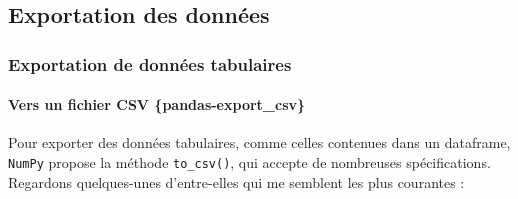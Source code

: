 \documentclass[
  12pt,
]{book}
\numberwithin{equation}{section}
\numberwithin{countremarque}{section}
\begin{document}
\subsection{Exportation des données}\label{exportation-des-donnuxe9es}

\subsubsection{Exportation de données tabulaires}\label{exportation-de-donnuxe9es-tabulaires}

\paragraph{Vers un fichier CSV \{pandas-export\_csv\}}\label{vers-un-fichier-csv-pandas-export_csv}

Pour exporter des données tabulaires, comme celles contenues dans un dataframe, \texttt{NumPy} propose la méthode \texttt{to\_csv()}, qui accepte de nombreuses spécifications. Regardons quelques-unes d'entre-elles qui me semblent les plus courantes :
\end{document}
